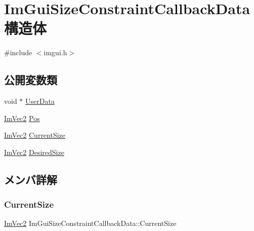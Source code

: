 \hypertarget{struct_im_gui_size_constraint_callback_data}{}\section{Im\+Gui\+Size\+Constraint\+Callback\+Data 構造体}
\label{struct_im_gui_size_constraint_callback_data}


{\ttfamily \#include $<$imgui.\+h$>$}

\subsection*{公開変数類}
\begin{DoxyCompactItemize}
\item 
void $\ast$ \mbox{\hyperlink{struct_im_gui_size_constraint_callback_data_a3b2fb1bd849f82edc78377f361433eac}{User\+Data}}
\item 
\mbox{\hyperlink{struct_im_vec2}{Im\+Vec2}} \mbox{\hyperlink{struct_im_gui_size_constraint_callback_data_ad3d81153905b00e6d513af4478d82cfd}{Pos}}
\item 
\mbox{\hyperlink{struct_im_vec2}{Im\+Vec2}} \mbox{\hyperlink{struct_im_gui_size_constraint_callback_data_ac7d5013d841044f410cba69344bdb4a1}{Current\+Size}}
\item 
\mbox{\hyperlink{struct_im_vec2}{Im\+Vec2}} \mbox{\hyperlink{struct_im_gui_size_constraint_callback_data_a1080a748a1769de07c5ae1e98de99ea3}{Desired\+Size}}
\end{DoxyCompactItemize}


\subsection{メンバ詳解}
\mbox{\label{struct_im_gui_size_constraint_callback_data_ac7d5013d841044f410cba69344bdb4a1}} 
\subsubsection{\texorpdfstring{Current\+Size}{CurrentSize}}
{\footnotesize\ttfamily \mbox{\hyperlink{struct_im_vec2}{Im\+Vec2}} Im\+Gui\+Size\+Constraint\+Callback\+Data\+::\+Current\+Size}

